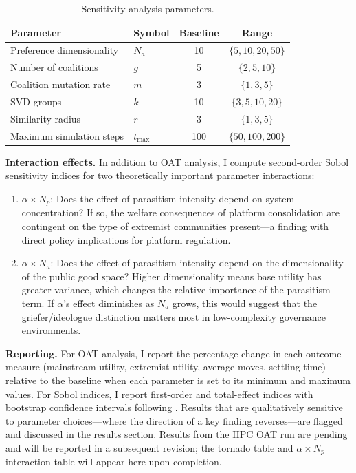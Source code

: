 \documentclass{article}
\begin{document}
\begin{table}[h]
\centering
\begin{tabular}{llcc}
\hline
\textbf{Parameter} & \textbf{Symbol} & \textbf{Baseline} & \textbf{Range} \\
\hline \hline
Preference dimensionality & $N_a$ & 10 & $\{5, 10, 20, 50\}$ \\
Number of coalitions & $g$ & 5 & $\{2, 5, 10\}$ \\
Coalition mutation rate & $m$ & 3 & $\{1, 3, 5\}$ \\
SVD groups & $k$ & 10 & $\{3, 5, 10, 20\}$ \\
Similarity radius & $r$ & 3 & $\{1, 3, 5\}$ \\
Maximum simulation steps & $t_{\max}$ & 100 & $\{50, 100, 200\}$ \\
\hline
\end{tabular}
\caption{Sensitivity analysis parameters.}
\label{tab:sensitivity}
\end{table}

\textbf{Interaction effects.} In addition to OAT analysis, I compute second-order Sobol sensitivity indices for two theoretically important parameter interactions:

\begin{enumerate}
    \item $\alpha \times N_p$: Does the effect of parasitism intensity depend on system concentration? If so, the welfare consequences of platform consolidation are contingent on the type of extremist communities present---a finding with direct policy implications for platform regulation.
    \item $\alpha \times N_a$: Does the effect of parasitism intensity depend on the dimensionality of the public good space? Higher dimensionality means base utility has greater variance, which changes the relative importance of the parasitism term. If $\alpha$'s effect diminishes as $N_a$ grows, this would suggest that the griefer/ideologue distinction matters most in low-complexity governance environments.
\end{enumerate}

\textbf{Reporting.} For OAT analysis, I report the percentage change in each outcome measure (mainstream utility, extremist utility, average moves, settling time) relative to the baseline when each parameter is set to its minimum and maximum values. For Sobol indices, I report first-order and total-effect indices with bootstrap confidence intervals following \cite{saltelli2010variance}. Results that are qualitatively sensitive to parameter choices---where the direction of a key finding reverses---are flagged and discussed in the results section. Results from the HPC OAT run are pending and will be reported in a subsequent revision; the tornado table and $\alpha \times N_p$ interaction table will appear here upon completion.
\end{document}
